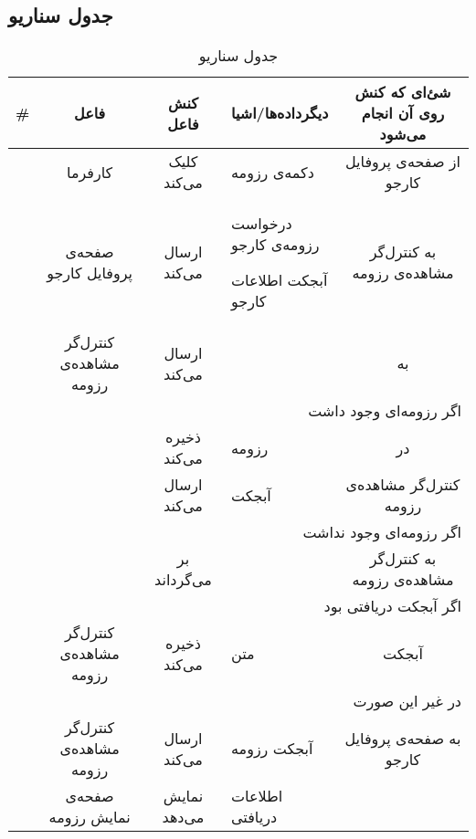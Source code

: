 \subsection{جدول سناریو}
\begin{table}[H]
	\caption{جدول سناریو }
	\begin{adjustbox}{width=\textwidth}
		\begin{tabular}{|c|c|c|p{}|c|}
			\hline
			\# & فاعل & کنش فاعل & دیگرداده‌ها/اشیا & شئ‌ای که کنش روی آن انجام می‌شود \\
			\hline
			\hline
			\sstep & 
			کارفرما &
			کلیک می‌کند &
			دکمه‌ی رزومه &
			از صفحه‌ی پروفایل کارجو \\
			\hline
			\sstep & 
			صفحه‌ی پروفایل کارجو &
			ارسال می‌کند &
			\begin{inparaitem}
				\item درخواست رزومه‌ی کارجو
				\item آبجکت \json اطلاعات کارجو
			\end{inparaitem} &
			به کنترل‌گر مشاهده‌ی رزومه \\
			\hline
			\sstep & 
			کنترل‌گر مشاهده‌ی رزومه &
			ارسال می‌کند &
			\json &
			به \gdm \\
			\hline
			\sstep & \multicolumn{4}{|r|}{اگر رزومه‌ای وجود داشت} \\
			\hline
			\sstep & 
			\gdm &
			ذخیره می‌کند &
			رزومه &
			در \json\\
			\hline
			\sstep & 
			\gdm &
			ارسال می‌کند &
			آبجکت \json &
			کنترل‌گر مشاهده‌ی رزومه \\
			\hline
			\sstep & \multicolumn{4}{|r|}{اگر رزومه‌ای وجود نداشت}\\
			\hline
			\sstep & 
			\gdm&
			بر می‌گرداند &
			\none&
			به کنترل‌گر مشاهده‌ی رزومه \\
			\hline
			\sstep & \multicolumn{4}{|r|}{اگر آبجکت دریافتی \none بود} \\
			\hline
			\sstep & 
			کنترل‌گر مشاهده‌ی رزومه &
			ذخیره می‌کند &
			متن \say{عدم وجود رزومه}&
			آبجکت \json\\
			\hline
			\sstep & \multicolumn{4}{|r|}{در غیر این صورت} \\
			\hline
			
			\sstep & 
			کنترل‌گر مشاهده‌ی رزومه &
			ارسال می‌کند &
			آبجکت \json رزومه &
			به صفحه‌ی پروفایل کارجو \\
			\hline
			\sstep &
			صفحه‌ی نمایش رزومه &
			نمایش می‌دهد &
			اطلاعات دریافتی &
			\\
			\hline
		\end{tabular}
	\end{adjustbox}
\end{table}
\setcounter{MainStepCounter}{0}
\setcounter{SenarioCounter}{0}
